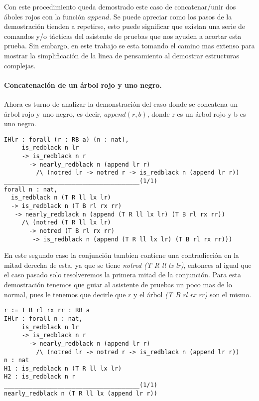 Con este procedimiento queda demostrado este caso de concatenar/unir dos \'aboles rojos con la 
funci\'on \hyperref[func_app]{$append$}. Se puede apreciar como los pasos de la demostraci\'on 
tienden a repetirse, esto puede significar que existan una serie de comandos y/o t\'acticas del 
asistente de pruebas que nos ayuden a acortar esta prueba. Sin embargo, en este trabajo se esta 
tomando el camino mas extenso para mostrar la simplificaci\'on de la linea de pensamiento al 
demostrar estructuras complejas.

\paragraph{Concatenaci\'on de un \'arbol rojo y uno negro.}

Ahora es turno de analizar la demonstraci\'on del caso donde se concatena un \'arbol rojo y uno 
negro, es decir, $append(r,b)$, donde r es un \'arbol rojo y b es uno negro.

\begin{verbatim}
IHlr : forall (r : RB a) (n : nat),
     is_redblack n lr
     -> is_redblack n r
       -> nearly_redblack n (append lr r)
         /\ (notred lr -> notred r -> is_redblack n (append lr r))
______________________________________(1/1)
forall n : nat,
  is_redblack n (T R ll lx lr)
  -> is_redblack n (T B rl rx rr)
   -> nearly_redblack n (append (T R ll lx lr) (T B rl rx rr))
     /\ (notred (T R ll lx lr)
       -> notred (T B rl rx rr)
        -> is_redblack n (append (T R ll lx lr) (T B rl rx rr)))
\end{verbatim}

En este segundo caso la conjunci\'on tambien contiene una contradicci\'on en la mitad derecha de
esta, ya que se tiene \textit{notred (T R ll lx lr)}, entonces al igual que el caso pasado solo
resolveremos la primera mitad de la conjunci\'on. Para esta demostración tenemos que guiar al 
asistente de pruebas un poco mas de lo normal, pues le tenemos que decirle que $r$ y el árbol 
\textit{(T B rl rx rr)} son el mismo.

\begin{verbatim}
r := T B rl rx rr : RB a
IHlr : forall n : nat,
     is_redblack n lr
     -> is_redblack n r
       -> nearly_redblack n (append lr r)
         /\ (notred lr -> notred r -> is_redblack n (append lr r))
n : nat
H1 : is_redblack n (T R ll lx lr)
H2 : is_redblack n r
______________________________________(1/1)
nearly_redblack n (T R ll lx (append lr r))
\end{verbatim}

